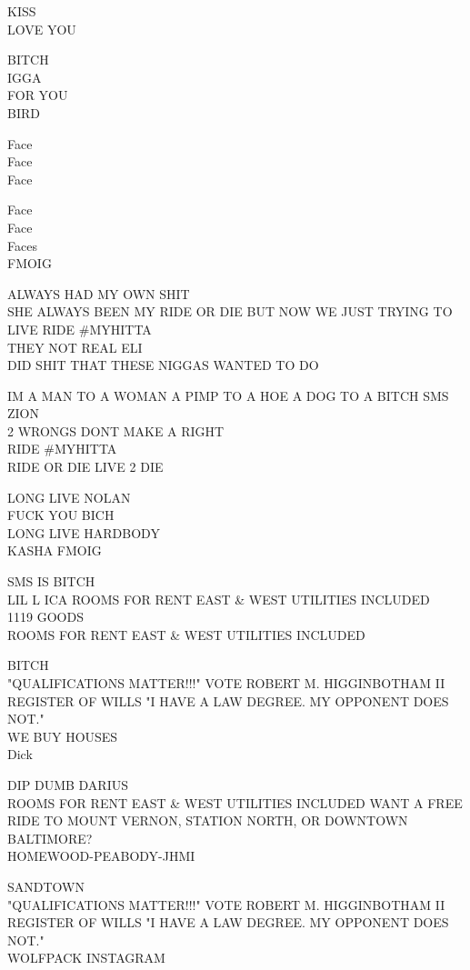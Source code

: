 \documentclass[10pt,letterpaper]{article}
\begin{document}
KISS\\
LOVE YOU

BITCH\\
IGGA\\
FOR YOU\\
BIRD

Face\\
Face\\
Face

Face\\
Face\\
Faces\\
FMOIG

ALWAYS HAD MY OWN SHIT\\
SHE ALWAYS BEEN MY RIDE OR DIE BUT NOW WE JUST TRYING TO LIVE RIDE \#MYHITTA\\
THEY NOT REAL ELI\\
DID SHIT THAT THESE NIGGAS WANTED TO DO

IM A MAN TO A WOMAN A PIMP TO A HOE A DOG TO A BITCH SMS ZION\\
2 WRONGS DONT MAKE A RIGHT\\
RIDE \#MYHITTA\\
RIDE OR DIE LIVE 2 DIE

LONG LIVE NOLAN\\
FUCK YOU BICH\\
LONG LIVE HARDBODY\\
KASHA FMOIG

SMS IS BITCH\\
LIL L ICA ROOMS FOR RENT EAST \& WEST UTILITIES INCLUDED\\
1119 GOODS\\
ROOMS FOR RENT EAST \& WEST UTILITIES INCLUDED

BITCH\\
"QUALIFICATIONS MATTER!!!" VOTE ROBERT M. HIGGINBOTHAM II REGISTER OF WILLS "I HAVE A LAW DEGREE.  MY OPPONENT DOES NOT."\\
WE BUY HOUSES\\
Dick

DIP DUMB DARIUS\\
ROOMS FOR RENT EAST \& WEST UTILITIES INCLUDED WANT A FREE RIDE TO MOUNT VERNON, STATION NORTH, OR DOWNTOWN BALTIMORE?\\
HOMEWOOD{-}PEABODY{-}JHMI

SANDTOWN\\
"QUALIFICATIONS MATTER!!!" VOTE ROBERT M. HIGGINBOTHAM II REGISTER OF WILLS "I HAVE A LAW DEGREE.  MY OPPONENT DOES NOT."\\
WOLFPACK INSTAGRAM
\end{document}
